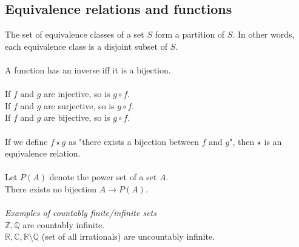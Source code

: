 \documentclass{article}
\newcommand{\R}{\mathbb{R}}
\newcommand{\Z}{\mathbb{Z}}
\newcommand{\Q}{\mathbb{Q}}
\newcommand{\C}{\mathbb{C}}
\begin{document}
\subsection{Equivalence relations and functions}
The set of equivalence classes of a set $ S $ form a partition of $ S $. In other words, each equivalence class is a disjoint subset of $ S $.
\\\\
A function has an inverse iff it is a bijection.
\\\\
If $ f $ and $ g $ are injective, so is $ g \circ f $.
\\
If $ f $ and $ g $ are surjective, so is $ g \circ f $.
\\
If $ f $ and $ g $ are bijective, so is $ g \circ f $.
\\\\
If we define $ f \star g $ as "there exists a bijection between $ f $ and $ g $", then $ \star $ is an equivalence relation.
\\\\
Let $ P(A) $ denote the power set of a set $ A $.
\\
There exists no bijection $ A \to P(A) $.
\\\\
\textit{Examples of countably finite/infinite sets}
\\
$ \Z, \Q $ are countably infinite.
\\
$ \R, \C , \R \setminus \Q $ (set of all irrationals) are uncountably infinite.
\end{document}
